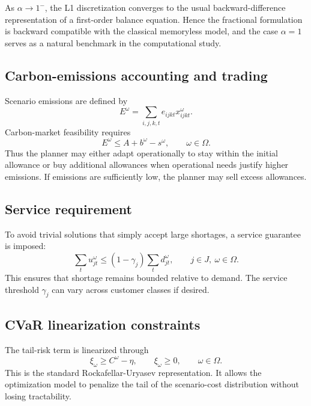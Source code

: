 As $\alpha\to 1^{-}$, the L1 discretization converges to the usual backward-difference representation of a first-order balance equation. Hence the fractional formulation is backward compatible with the classical memoryless model, and the case $\alpha=1$ serves as a natural benchmark in the computational study.

\subsection{Carbon-emissions accounting and trading}
Scenario emissions are defined by
\begin{equation}
E^{\omega}=\sum_{i,j,k,t}e_{ijkt}x_{ijkt}^{\omega}.
\end{equation}
Carbon-market feasibility requires
\begin{equation}
E^{\omega}\le A+b^{\omega}-s^{\omega},
\qquad \omega\in\Omega.
\end{equation}
Thus the planner may either adapt operationally to stay within the initial allowance or buy additional allowances when operational needs justify higher emissions. If emissions are sufficiently low, the planner may sell excess allowances.

\subsection{Service requirement}
To avoid trivial solutions that simply accept large shortages, a service guarantee is imposed:
\begin{equation}
\sum_t u_{jt}^{\omega}\le (1-\gamma_j)\sum_t d_{jt}^{\omega},
\qquad j\in J,\ \omega\in\Omega.
\end{equation}
This ensures that shortage remains bounded relative to demand. The service threshold $\gamma_j$ can vary across customer classes if desired.

\subsection{CVaR linearization constraints}
The tail-risk term is linearized through
\begin{equation}
\xi_{\omega}\ge C^{\omega}-\eta,
\qquad \xi_{\omega}\ge 0,
\qquad \omega\in\Omega.
\end{equation}
This is the standard Rockafellar-Uryasev representation. It allows the optimization model to penalize the tail of the scenario-cost distribution without losing tractability.

